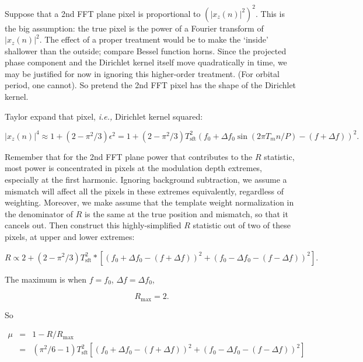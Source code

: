 \documentclass{article}
\begin{document}
Suppose that a 2nd FFT plane pixel is proportional to $(|x_z(n)|^2)^2$. This is the
big assumption: the true pixel is the power of a Fourier transform of
$|x_z(n)|^2$. The effect of a proper treatment would be to make the
`inside' shallower than the outside; compare Bessel function horns.
Since the projected phase component and the Dirichlet kernel itself move
quadratically in time, we may be justified for now in ignoring this
higher-order treatment. (For orbital period, one cannot). So pretend the
2nd FFT pixel has the shape of the Dirichlet kernel.

Taylor expand that pixel, \textit{i.e.,} Dirichlet kernel squared:

\begin{equation}
|x_z (n)|^4 \approx 1 + (2- \pi^2/3) \epsilon^2
             = 1 + (2 -\pi^2/3) T_\mathrm{sft}^2
                 (f_0+ \Delta f_0 \sin(2\pi T_m n /P) - (f+\Delta f))^2.
\end{equation}

Remember that for the 2nd FFT plane power that contributes to the $R$ statistic, most power is concentrated in pixels at the modulation depth extremes, especially at the first harmonic.
Ignoring background subtraction, we assume a mismatch will affect all the pixels in these extremes equivalently, regardless of weighting.
Moreover, we make assume that the template weight normalization in the denominator of $R$ is the same at the true position and mismatch, so that it cancels out.
Then construct this highly-simplified $R$ statistic out of two of these pixels, at upper and
lower extremes:

\begin{equation}
R \propto 2 + (2 -\pi^2/3) T_\mathrm{sft}^2 *
             [(f_0+\Delta f_0- (f+\Delta f))^2 + (f_0-\Delta f_0- (f-\Delta f))^2].
\end{equation}

\noindent
The maximum is when $f=f_0$, $\Delta f = \Delta f_0$,

\begin{equation}
R_\mathrm{max} = 2.
\end{equation}

\noindent So 

\begin{eqnarray}
\mu &=& 1 - R / R_\mathrm{max}\\
      &=& (\pi^2/6 - 1) T_\mathrm{sft}^2
             [(f_0+\Delta f_0- (f+\Delta f))^2 + (f_0-\Delta f_0- (f- \Delta f))^2]
\end{eqnarray}
\end{document}
